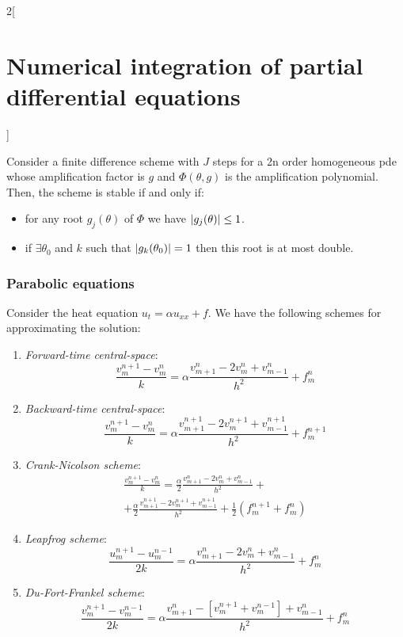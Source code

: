 \documentclass[../../../main_math.tex]{subfiles}
\begin{document}
\begin{multicols}{2}[\section{Numerical integration of partial differential equations}]
\begin{definition}
  \end{definition}
  \begin{theorem}
    Consider a finite difference scheme with $J$ steps for a 2n order homogeneous pde whose amplification factor is $g$ and $\Phi(\theta, g)$ is the amplification polynomial. Then, the scheme is stable if and only if:
    \begin{itemize}
      \item for any root $g_j(\theta)$ of $\Phi$ we have $\abs{g_j(\theta)}\leq 1$.
      \item if $\exists \theta_0$ and $k$ such that $\abs{g_k(\theta_0)}=1$ then this root is at most double.
    \end{itemize}
  \end{theorem}
  \subsubsection{Parabolic equations}
  \begin{proposition}
    Consider the heat equation $u_t=\alpha u_{xx}+f$. We have the following schemes for approximating the solution:
    \begin{enumerate}
      \item \emph{Forward-time central-space}:
            $$\frac{v_m^{n+1}-v_m^n}{k}=\alpha\frac{v_{m+1}^n-2v_m^n+v_{m-1}^n}{h^2}+f_m^n$$
      \item \emph{Backward-time central-space}:
            $$\frac{v_m^{n+1}-v_m^n}{k}=\alpha\frac{v_{m+1}^{n+1}-2v_m^{n+1}+v_{m-1}^{n+1}}{h^2}+f_m^{n+1}$$
      \item \emph{Crank-Nicolson scheme}:
            \begin{multline*}
              \frac{v_m^{n+1}-v_m^n}{k}=\frac{\alpha}{2}\frac{v_{m+1}^n-2v_m^n+v_{m-1}^n}{h^2}+\\+\frac{\alpha}{2}\frac{v_{m+1}^{n+1}-2v_m^{n+1}+v_{m-1}^{n+1}}{h^2}+\frac{1}{2}(f_m^{n+1}+f_m^n)
            \end{multline*}
      \item \emph{Leapfrog scheme}:
            \begin{equation*}
              \frac{u_m^{n+1}-u_m^{n-1}}{2k}=\alpha\frac{v_{m+1}^n-2v_m^n+v_{m-1}^n}{h^2}+f_m^n
            \end{equation*}
      \item \emph{Du-Fort-Frankel scheme}:
            \begin{equation*}
              \frac{v_m^{n+1}-v_m^{n-1}}{2k}=\alpha\frac{v_{m+1}^{n}-[v_m^{n+1}\!+\!v_m^{n-1}]+v_{m-1}^{n}}{h^2}+f_m^{n}
            \end{equation*}
    \end{enumerate}
  \end{proposition}

\end{multicols}
\end{document}
